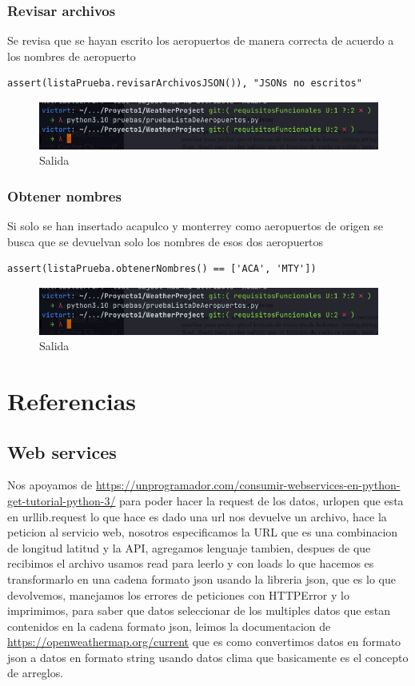 \documentclass[12pt]{article}
\begin{document}
\subsubsection{Revisar archivos}
Se revisa que se hayan escrito los aeropuertos de manera correcta de acuerdo a los nombres de aeropuerto
\begin{verbatim}
assert(listaPrueba.revisarArchivosJSON()), "JSONs no escritos"
\end{verbatim}
\begin{figure}[h!]
    \centering
    \includegraphics[scale=0.6]{pruebasPy/listaAeropuertos/bien.png}
    \caption{Salida}
  \end{figure}

\subsubsection{Obtener nombres}
Si solo se han insertado acapulco y monterrey como aeropuertos de origen se busca que se devuelvan solo los nombres de esos dos aeropuertos
\begin{verbatim}
assert(listaPrueba.obtenerNombres() == ['ACA', 'MTY'])
\end{verbatim}
\begin{figure}[h!]
  \centering
  \includegraphics[scale=0.6]{pruebasPy/listaAeropuertos/bien.png}
  \caption{Salida}
\end{figure}
\section{Referencias}
\subsection{Web services}
Nos apoyamos de \url{https://unprogramador.com/consumir-webservices-en-python-get-tutorial-python-3/} para poder hacer la request de los datos, urlopen que esta en urllib.request lo que hace es dado una url nos devuelve un archivo, hace la peticion al servicio web, nosotros especificamos la URL que es una combinacion de longitud latitud y la API,  agregamos lenguaje tambien, despues de que recibimos el archivo usamos read para leerlo y con loads lo que hacemos es transformarlo en una cadena formato json usando la libreria json, que es lo que devolvemos, manejamos los errores de peticiones con HTTPError y lo imprimimos, para saber que datos seleccionar de los multiples datos que estan contenidos en la cadena formato json, leimos la documentacion de \url{https://openweathermap.org/current} que es como convertimos datos en formato json a datos en formato string usando datos clima que basicamente es el concepto de arreglos.
\end{document}
